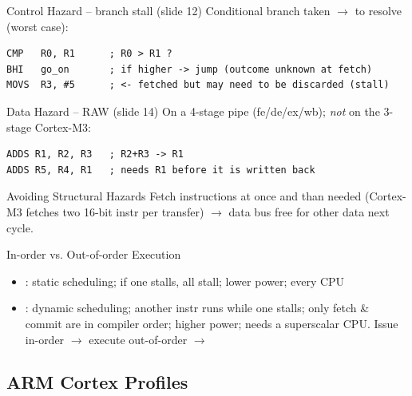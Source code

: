 \begin{examplecode}{Control Hazard -- branch stall (slide 12)}
    Conditional branch taken $\to$  to resolve (worst case):
\begin{lstlisting}[language=armasm, style=basesmol, aboveskip=2pt, belowskip=2pt]
CMP   R0, R1      ; R0 > R1 ?
BHI   go_on       ; if higher -> jump (outcome unknown at fetch)
MOVS  R3, #5      ; <- fetched but may need to be discarded (stall)
\end{lstlisting}
\end{examplecode}


\begin{examplecode}{Data Hazard -- RAW (slide 14)}
    On a 4-stage pipe (fe/de/ex/wb); \emph{not} on the 3-stage Cortex-M3:
\begin{lstlisting}[language=armasm, style=basesmol, aboveskip=2pt, belowskip=2pt]
ADDS R1, R2, R3   ; R2+R3 -> R1
ADDS R5, R4, R1   ; needs R1 before it is written back
\end{lstlisting}
\end{examplecode}

\begin{corollary}{Avoiding Structural Hazards}
    Fetch  instructions at once and  than
    needed (Cortex-M3 fetches two 16-bit instr per transfer) $\to$ data bus free
    for other data next cycle.
\end{corollary}

\multend

\begin{definition}{In-order vs. Out-of-order Execution}
    \begin{itemize}
        \item {}: static scheduling; if one stalls, all stall;
              lower power; every CPU
        \item {}: dynamic scheduling; another instr runs while
              one stalls; only fetch \& commit are in compiler order; higher power;
              needs a superscalar CPU. Issue in-order $\to$ execute out-of-order
              $\to$ 
    \end{itemize}
\end{definition}

\subsection{ARM Cortex Profiles}


